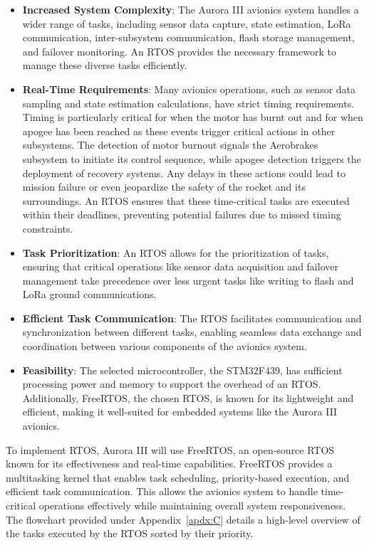 \begin{itemize}
  \item \textbf{Increased System Complexity}: The Aurora III avionics system handles a wider range of tasks, including sensor data capture, state estimation, LoRa communication, inter-subsystem communication, flash storage management, and failover monitoring. An RTOS provides the necessary framework to manage these diverse tasks efficiently. 
  \item \textbf{Real-Time Requirements}: Many avionics operations, such as sensor data sampling and state estimation calculations, have strict timing requirements. Timing is particularly critical for when the motor has burnt out and for when apogee has been reached as these events trigger critical actions in other subsystems. The detection of motor burnout signals the Aerobrakes subsystem to initiate its control sequence, while apogee detection triggers the deployment of recovery systems. Any delays in these actions could lead to mission failure or even jeopardize the safety of the rocket and its surroundings. An RTOS ensures that these time-critical tasks are executed within their deadlines, preventing potential failures due to missed timing constraints. 
  \item \textbf{Task Prioritization}: An RTOS allows for the prioritization of tasks, ensuring that critical operations like sensor data acquisition and failover management take precedence over less urgent tasks like writing to flash and LoRa ground communications. 
  \item \textbf{Efficient Task Communication}: The RTOS facilitates communication and synchronization between different tasks, enabling seamless data exchange and coordination between various components of the avionics system. 
  \item \textbf{Feasibility}: The selected microcontroller, the STM32F439, has sufficient processing power and memory to support the overhead of an RTOS. Additionally, FreeRTOS, the chosen RTOS, is known for its lightweight and efficient, making it well-suited for embedded systems like the Aurora III avionics. 
\end{itemize}

To implement RTOS, Aurora III will use FreeRTOS, an open-source RTOS known for its effectiveness and real-time capabilities. FreeRTOS provides a multitasking kernel that enables task scheduling, priority-based execution, and efficient task communication. This allows the avionics system to handle time-critical operations effectively while maintaining overall system responsiveness. The flowchart provided under Appendix~\ref{apdx:C} details a high-level overview of the tasks executed by the RTOS sorted by their priority. 

